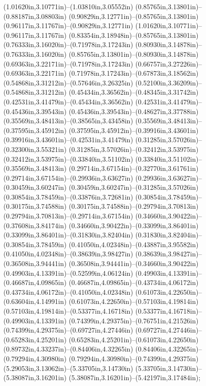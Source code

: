 (1.01620in,3.10771in)--(1.03810in,3.05552in) (0.85765in,3.13801in)--(0.88187in,3.08803in) (0.90829in,3.12771in)--(0.85765in,3.13801in) (0.96117in,3.11767in)--(0.90829in,3.12771in) (1.01620in,3.10771in)--(0.96117in,3.11767in) (0.83354in,3.18948in)--(0.85765in,3.13801in) (0.76333in,3.16020in)--(0.71978in,3.17243in) (0.80930in,3.14878in)--(0.76333in,3.16020in) (0.85765in,3.13801in)--(0.80930in,3.14878in) (0.69363in,3.22171in)--(0.71978in,3.17243in) (0.66757in,3.27226in)--(0.69363in,3.22171in) (0.71978in,3.17243in)--(0.67873in,3.18562in) (0.54868in,3.31212in)--(0.57646in,3.26325in) (0.52100in,3.36209in)--(0.54868in,3.31212in) (0.45434in,3.36562in)--(0.48345in,3.31742in) (0.42531in,3.41479in)--(0.45434in,3.36562in) (0.42531in,3.41479in)--(0.45436in,3.39543in) (0.45436in,3.39543in)--(0.48627in,3.37788in) (0.35569in,3.48413in)--(0.38565in,3.43458in) (0.35569in,3.48413in)--(0.37595in,3.45912in) (0.37595in,3.45912in)--(0.39916in,3.43601in) (0.39916in,3.43601in)--(0.42531in,3.41479in) (0.31285in,3.57026in)--(0.32300in,3.55321in) (0.31285in,3.57026in)--(0.32412in,3.53975in) (0.32412in,3.53975in)--(0.33840in,3.51102in) (0.33840in,3.51102in)--(0.35569in,3.48413in) (0.29714in,3.67154in)--(0.32770in,3.61761in) (0.29714in,3.67154in)--(0.29936in,3.63627in) (0.29936in,3.63627in)--(0.30459in,3.60247in) (0.30459in,3.60247in)--(0.31285in,3.57026in) (0.30854in,3.78459in)--(0.33876in,3.72681in) (0.30854in,3.78459in)--(0.30175in,3.74588in) (0.30175in,3.74588in)--(0.29794in,3.70813in) (0.29794in,3.70813in)--(0.29714in,3.67154in) (0.34660in,3.90422in)--(0.37608in,3.84174in) (0.34660in,3.90422in)--(0.33099in,3.86401in) (0.33099in,3.86401in)--(0.31830in,3.82404in) (0.31830in,3.82404in)--(0.30854in,3.78459in) (0.41050in,4.02348in)--(0.43887in,3.95582in) (0.41050in,4.02348in)--(0.38639in,3.98427in) (0.38639in,3.98427in)--(0.36508in,3.94441in) (0.36508in,3.94441in)--(0.34660in,3.90422in) (0.49903in,4.13391in)--(0.52599in,4.06124in) (0.49903in,4.13391in)--(0.46687in,4.09865in) (0.46687in,4.09865in)--(0.43734in,4.06172in) (0.43734in,4.06172in)--(0.41050in,4.02348in) (0.61073in,4.22650in)--(0.63604in,4.14991in) (0.61073in,4.22650in)--(0.57103in,4.19814in) (0.57103in,4.19814in)--(0.53377in,4.16718in) (0.53377in,4.16718in)--(0.49903in,4.13391in) (0.74399in,4.29375in)--(0.76751in,4.21526in) (0.74399in,4.29375in)--(0.69727in,4.27446in) (0.69727in,4.27446in)--(0.65283in,4.25201in) (0.65283in,4.25201in)--(0.61073in,4.22650in) (0.89732in,4.33237in)--(0.84406in,4.32265in) (0.84406in,4.32265in)--(0.79294in,4.30980in) (0.79294in,4.30980in)--(0.74399in,4.29375in) (5.29053in,3.13062in)--(5.33705in,3.14730in) (5.33705in,3.14730in)--(5.38087in,3.16201in) (5.38087in,3.16201in)--(5.42197in,3.17484in);
